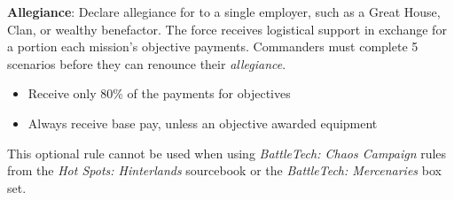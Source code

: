 \item {\bfseries Allegiance}: Declare allegiance for to a single employer, such as a Great House, Clan, or wealthy benefactor.
The force receives logistical support in exchange for a portion each mission's objective payments.
Commanders must complete 5 scenarios before they can renounce their \emph{allegiance}.

\begin{itemize}

\item Receive only 80\% of the payments for objectives

\item Always receive base pay, unless an objective awarded equipment

\end{itemize}

This optional rule cannot be used when using \emph{BattleTech: Chaos Campaign} rules from the \emph{Hot Spots: Hinterlands} sourcebook or the \emph{BattleTech: Mercenaries} box set.
